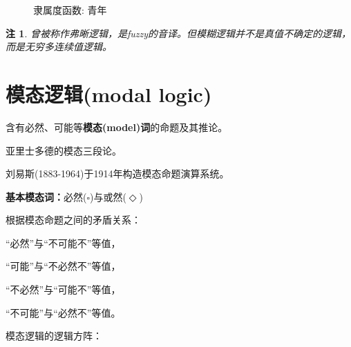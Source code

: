 \documentclass[12pt,onecolumn,a4paper]{book}
\newtheorem*{note}{注}
\numberwithin{table}{subsection}
\numberwithin{equation}{subsection}
\begin{document}
\begin{figure}
    \begin{center}
    \caption{隶属度函数: 青年}
    \end{center}
\end{figure}


\begin{note}
    曾被称作弗晰逻辑，是fuzzy的音译。但模糊逻辑并不是真值不确定的逻辑，而是无穷多连续值逻辑。
\end{note}

\newpage

\section{模态逻辑(modal logic)}

含有必然、可能等\textbf{模态(model)词}的命题及其推论。

亚里士多德的模态三段论。

刘易斯(1883-1964)于1914年构造模态命题演算系统。

\textbf{基本模态词：}必然($\square$)与或然($\Diamond$)

根据模态命题之间的矛盾关系：

“必然”与“不可能不”等值，

“可能”与“不必然不”等值，

“不必然”与“可能不”等值，

“不可能”与“必然不”等值。

模态逻辑的逻辑方阵：
\end{document}
